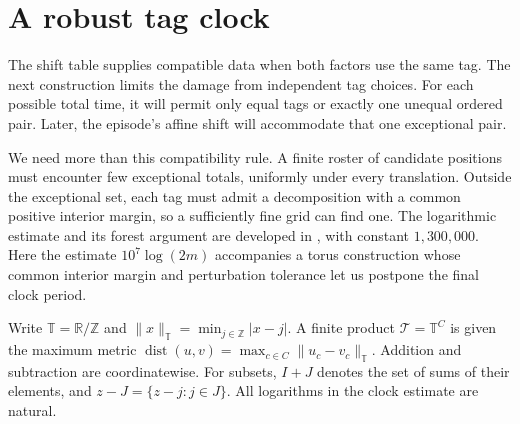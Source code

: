 \section{A robust tag clock}\label{clock:section}

The shift table supplies compatible data when both factors use the same
tag. The next construction limits the damage from independent tag
choices. For each possible total time, it will permit only equal tags
or exactly one unequal ordered pair. Later, the episode's affine shift
will accommodate that one exceptional pair.

We need more than this compatibility rule. A finite roster of candidate
positions must encounter few exceptional totals, uniformly under every
translation. Outside the exceptional set, each tag must admit a
decomposition with a common positive interior margin, so a sufficiently
fine grid can find one. The logarithmic estimate and its
forest argument are developed in \cite[Lemma~3.1]{HeightThirteen}, with
constant $1{,}300{,}000$. Here the estimate $10^7\log(2m)$ accompanies a
torus construction whose common interior margin and perturbation
tolerance let us postpone the final clock period.

Write $\mathbb T=\mathbb R/\mathbb Z$ and
$\|x\|_{\mathbb T}=\min_{j\in\mathbb Z}|x-j|$. A finite product
$\mathcal T=\mathbb T^C$ is given the maximum metric
$\operatorname{dist}(u,v)=\max_{c\in C}\|u_c-v_c\|_{\mathbb T}$.
Addition and subtraction are coordinatewise. For subsets, $I+J$ denotes
the set of sums of their elements, and $z-J=\{z-j:j\in J\}$.
All logarithms in the clock estimate are natural.

